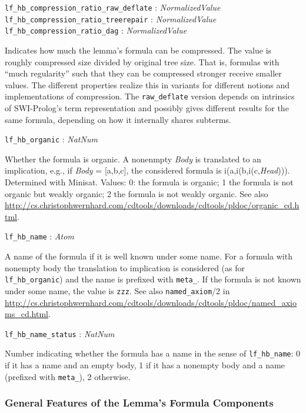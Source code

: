 \documentclass[a4paper,11pt]{article}
\newcommand{\f}[1]{\texttt{#1}}
\newcommand{\var}[1]{\textnormal{\textit{#1}}}
\newcommand{\lit}[1]{\textnormal{\textit{#1}}}
\newcommand{\propsig}[2]
{\noindent \f{#1} : #2}
\newcommand{\propdesc}[1]
{\par \hspace*{\fill}\begin{minipage}{0.9\textwidth}#1\end{minipage}\par\smallskip}
\begin{document}
\propsig{lf\_hb\_compression\_ratio\_raw\_deflate}{\lit{NormalizedValue}}\\
\propsig{lf\_hb\_compression\_ratio\_treerepair}{\lit{NormalizedValue}}\\
\propsig{lf\_hb\_compression\_ratio\_dag}{\lit{NormalizedValue}}
\propdesc{Indicates how much the lemma's formula can be compressed. The value
  is roughly compressed size divided by original tree size. That is, formulas
  with ``much regularity'' such that they can be compressed stronger receive
  smaller values. The different properties realize this in variants for
  different notions and implementations of compression. The \f{raw\_deflate}
  version depends on intrinsics of SWI-Prolog's term representation and
  possibly gives different results for the same formula, depending on how it
  internally shares subterms.}

\propsig{lf\_hb\_organic}{\lit{NatNum}}

\propdesc{Whether the formula is organic. A nonenmpty \var{Body} is translated
  to an implication, e.g., if \var{Body} = [a,b,c], the considered formula is
  i(a,i(b,i(c,\var{Head}))). Determined with Minisat. Values: 0: the formula
  is organic; 1 the formula is not organic but weakly organic; 2 the formula
  is not weakly organic. See also
  \url{http://cs.christophwernhard.com/cdtools/downloads/cdtools/pldoc/organic_cd.html}.}

\propsig{lf\_hb\_name}{\lit{Atom}}

\propdesc{A name of the formula if it is well known under some name. For a
  formula with nonempty body the translation to implication is considered (as
  for \f{lf\_hb\_organic}) and the name is prefixed with \f{meta\_}. If the
  formula is not known under some name, the value is \f{zzz}. See also
  \f{named\_axiom}/2 in
  \url{http://cs.christophwernhard.com/cdtools/downloads/cdtools/pldoc/named_axioms_cd.html}.}

\propsig{lf\_hb\_name\_status}{\lit{NatNum}}

\propdesc{Number indicating whether the formula has a name in the sense of
  \f{lf\_hb\_name}: 0 if it has a name and an empty body, 1 if it has a
  nonempty body and a name (prefixed with \f{meta\_}), 2 otherwise.}

\subsubsection{General Features of the Lemma's Formula Components}
\end{document}
